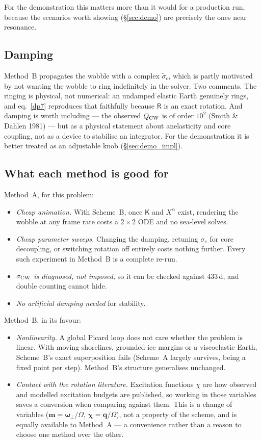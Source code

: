 \documentclass[11pt,a4paper]{article}
\newcommand{\bw}{\bm{\omega}}
\newcommand{\bq}{\mathbf{q}}
\newcommand{\R}{\mathsf{R}}
\newcommand{\K}{\mathsf{K}}
\begin{document}
For the demonstration this matters more than it would for a production run, because the scenarios
worth showing (\S\ref{sec:demo}) are precisely the ones near resonance.

\subsection{Damping}
\label{sec:compare_damping}

Method~B propagates the wobble with a complex $\tilde\sigma_c$, which is partly motivated by not
wanting the wobble to ring indefinitely in the solver. Two comments. The ringing is physical, not
numerical: an undamped elastic Earth
genuinely rings, and eq.~\eqref{dp7} reproduces that faithfully because $\R$ is an exact rotation.
And damping is worth including --- the observed $Q_{\rm CW}$ is of order $10^2$ (Smith \& Dahlen 1981) --- but as a physical
statement about anelasticity and core coupling, not as a device to stabilise an integrator. For the
demonstration it is better treated as an adjustable knob (\S\ref{sec:demo_impl}).

\subsection{What each method is good for}

Method~A, for this problem:
\begin{itemize}
  \item \emph{Cheap animation.} With Scheme~B, once $\K$ and $X^\alpha$ exist, rendering the wobble
  at any frame rate costs a $2\times2$ ODE and no sea-level solves.
  \item \emph{Cheap parameter sweeps.} Changing the damping, retuning $\sigma_e$ for core
  decoupling, or switching rotation off entirely costs nothing further. Every such experiment in
  Method~B is a complete re-run.
  \item \emph{$\sigma_{\rm CW}$ is diagnosed, not imposed,} so it can be checked against 433\,d, and
  double counting cannot hide.
  \item \emph{No artificial damping needed} for stability.
\end{itemize}

Method~B, in its favour:
\begin{itemize}
  \item \emph{Nonlinearity.} A global Picard loop does not care whether the problem is linear. With
  moving shorelines, grounded-ice margins or a viscoelastic Earth, Scheme~B's exact superposition
  fails (Scheme~A largely survives, being a fixed point per step). Method~B's structure generalises
  unchanged.
  \item \emph{Contact with the rotation literature.} Excitation functions $\chi$ are how observed and
  modelled excitation budgets are published, so working in those variables saves a conversion when
  comparing against them. This is a change of variables ($\mathbf{m}=\bw_\perp/\Omega$,
  $\bm\chi=\bq/\Omega$), not a property of the scheme, and is equally available to Method~A --- a
  convenience rather than a reason to choose one method over the other.
\end{itemize}
\end{document}
